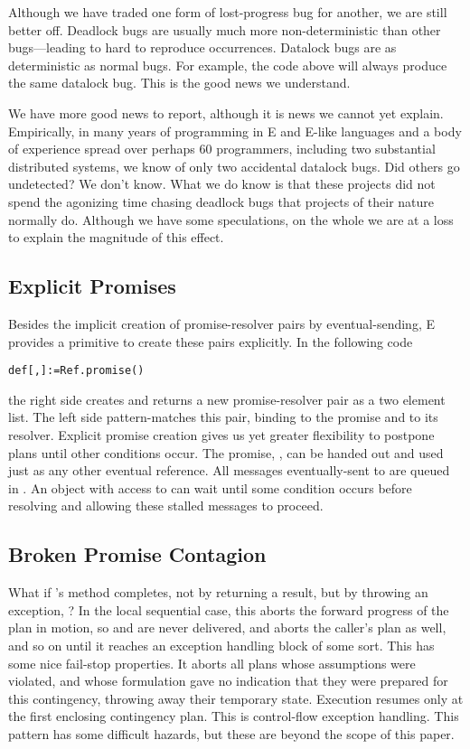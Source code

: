 \documentclass{llncs}
\begin{document}
Although we have traded one form of lost-progress bug for another, we
are still better off. Deadlock bugs are usually much more
non-deterministic than other bugs---leading to hard to reproduce
occurrences. Datalock bugs are as deterministic as normal
bugs.  For example, the code above will always
produce the same datalock bug. This is the good news we understand.

We have more good news to report, although it is news we cannot yet
explain. Empirically, in many years of programming in E and E-like
languages and a body of experience spread over perhaps 60 programmers,
including two substantial distributed systems, we know of only two
accidental datalock bugs. Did others go undetected? We don't
know. What we do know is that these projects did not spend the
agonizing time chasing deadlock bugs that projects of their nature
normally do. Although we have some speculations, on the whole we are
at a loss to explain the magnitude of this effect.

\subsection{Explicit Promises}

Besides the implicit creation of promise-resolver pairs by
eventual-sending, E provides a primitive to create these pairs
explicitly. In the following code
%
\begin{alltt}
    def [, ] := Ref.promise()
\end{alltt}
%
the right side creates and returns a new promise-resolver pair as a
two element list. The left side pattern-matches this pair, binding
 to the promise and  to its resolver. Explicit promise
creation gives us yet greater flexibility to postpone plans until
other conditions occur. The promise, , can be handed out and
used just as any other eventual reference. All messages
eventually-sent to  are queued in . An object with
access to  can wait until some condition occurs before
resolving  and allowing these stalled messages to proceed.

\subsection{Broken Promise Contagion}

What if 's  method completes, not by
returning a result, but by throwing an exception, ? In the
local sequential case, this aborts the forward progress of the plan in
motion, so  and  are never delivered, and aborts
the caller's plan as well, and so on until it reaches an exception
handling block of some sort. This has some nice fail-stop
properties. It aborts all plans whose assumptions were violated, and
whose formulation gave no indication that they were prepared for this
contingency, throwing away their temporary state. Execution resumes
only at the first enclosing contingency plan. This is control-flow
exception handling. This pattern has some difficult hazards, but these
are beyond the scope of this paper.
\end{document}
